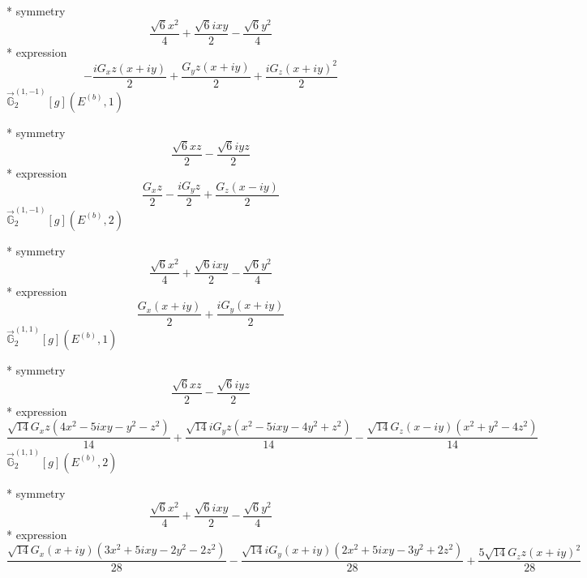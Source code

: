 \documentclass[fleqn,8pt]{jsarticle}
\begin{document}
\noindent\quad ** symmetry
\begin{dmath*}
\frac{\sqrt{6} x^{2}}{4} + \frac{\sqrt{6} i x y}{2} - \frac{\sqrt{6} y^{2}}{4}
\end{dmath*}
\noindent\quad ** expression
\begin{dmath*}
- \frac{i G_{x} z \left(x + i y\right)}{2} + \frac{G_{y} z \left(x + i y\right)}{2} + \frac{i G_{z} \left(x + i y\right)^{2}}{2}
\end{dmath*}
\noindent\quad $\vec{\mathbb{G}}_{2}^{(1,-1)}[g](E^{(b)},1)$

\noindent\quad ** symmetry
\begin{dmath*}
\frac{\sqrt{6} x z}{2} - \frac{\sqrt{6} i y z}{2}
\end{dmath*}
\noindent\quad ** expression
\begin{dmath*}
\frac{G_{x} z}{2} - \frac{i G_{y} z}{2} + \frac{G_{z} \left(x - i y\right)}{2}
\end{dmath*}
\noindent\quad $\vec{\mathbb{G}}_{2}^{(1,-1)}[g](E^{(b)},2)$

\noindent\quad ** symmetry
\begin{dmath*}
\frac{\sqrt{6} x^{2}}{4} + \frac{\sqrt{6} i x y}{2} - \frac{\sqrt{6} y^{2}}{4}
\end{dmath*}
\noindent\quad ** expression
\begin{dmath*}
\frac{G_{x} \left(x + i y\right)}{2} + \frac{i G_{y} \left(x + i y\right)}{2}
\end{dmath*}
\noindent\quad $\vec{\mathbb{G}}_{2}^{(1,1)}[g](E^{(b)},1)$

\noindent\quad ** symmetry
\begin{dmath*}
\frac{\sqrt{6} x z}{2} - \frac{\sqrt{6} i y z}{2}
\end{dmath*}
\noindent\quad ** expression
\begin{dmath*}
\frac{\sqrt{14} G_{x} z \left(4 x^{2} - 5 i x y - y^{2} - z^{2}\right)}{14} + \frac{\sqrt{14} i G_{y} z \left(x^{2} - 5 i x y - 4 y^{2} + z^{2}\right)}{14} - \frac{\sqrt{14} G_{z} \left(x - i y\right) \left(x^{2} + y^{2} - 4 z^{2}\right)}{14}
\end{dmath*}
\noindent\quad $\vec{\mathbb{G}}_{2}^{(1,1)}[g](E^{(b)},2)$

\noindent\quad ** symmetry
\begin{dmath*}
\frac{\sqrt{6} x^{2}}{4} + \frac{\sqrt{6} i x y}{2} - \frac{\sqrt{6} y^{2}}{4}
\end{dmath*}
\noindent\quad ** expression
\begin{dmath*}
\frac{\sqrt{14} G_{x} \left(x + i y\right) \left(3 x^{2} + 5 i x y - 2 y^{2} - 2 z^{2}\right)}{28} - \frac{\sqrt{14} i G_{y} \left(x + i y\right) \left(2 x^{2} + 5 i x y - 3 y^{2} + 2 z^{2}\right)}{28} + \frac{5 \sqrt{14} G_{z} z \left(x + i y\right)^{2}}{28}
\end{dmath*}
\end{document}
